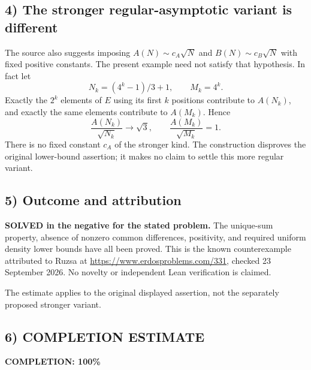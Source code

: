 \subsection*{4) The stronger regular-asymptotic variant is different}
The source also suggests imposing $A(N)\sim c_A\sqrt N$ and $B(N)\sim c_B\sqrt N$ with fixed positive constants. The present example need not satisfy that hypothesis. In fact let
\[N_k=(4^k-1)/3+1,\qquad M_k=4^k.
\]
Exactly the $2^k$ elements of $E$ using its first $k$ positions contribute to $A(N_k)$, and exactly the same elements contribute to $A(M_k)$. Hence
\[\frac{A(N_k)}{\sqrt{N_k}}\longrightarrow\sqrt3,
\qquad\frac{A(M_k)}{\sqrt{M_k}}=1.
\]
There is no fixed constant $c_A$ of the stronger kind. The construction disproves the original lower-bound assertion; it makes no claim to settle this more regular variant.

\subsection*{5) Outcome and attribution}
\textbf{SOLVED in the negative for the stated problem.} The unique-sum property, absence of nonzero common differences, positivity, and required uniform density lower bounds have all been proved. This is the known counterexample attributed to Ruzsa at \url{https://www.erdosproblems.com/331}, checked 23 September 2026. No novelty or independent Lean verification is claimed.

The estimate applies to the original displayed assertion, not the separately proposed stronger variant.
\subsection*{6) COMPLETION ESTIMATE}
\textbf{COMPLETION: 100\%}
